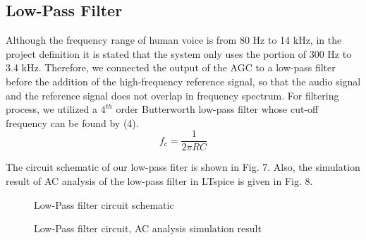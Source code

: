 \documentclass[conference]{IEEEtran}
\begin{document}
\subsection{Low-Pass Filter}
Although the frequency range of human voice is from 80 Hz to 14 kHz, in the project definition it is stated that the system only uses the portion of 300 Hz to 3.4 kHz. Therefore, we connected the output of the AGC to a low-pass filter before the addition of the high-frequency reference signal, so that the audio signal and the reference signal does not overlap in frequency spectrum. For filtering process, we utilized a \(4^{th}\) order Butterworth low-pass filter whose cut-off frequency can be found by (4). 
\begin{equation}\label{eq:a}
f_c = \frac{1}{2\pi RC}
\end{equation}  
\par The circuit schematic of our low-pass fiter is shown in Fig. 7.  Also, the simulation result of AC analysis of the low-pass filter in LTspice is given in Fig. 8.
 \begin{figure}[H]
   \centerline{}
    \caption{Low-Pass filter circuit schematic}
\end{figure}
 \begin{figure}[H]
   \centerline{}
    \caption{Low-Pass filter circuit, AC analysis simulation result}
\end{figure} 
\end{document}
